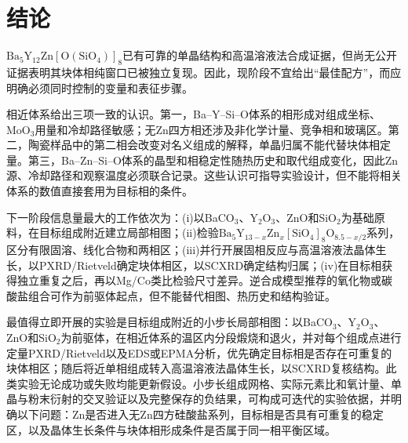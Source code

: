 \section{结论}
\label{sec:transferability}

$\mathrm{Ba_5Y_{12}Zn[O(SiO_4)]_8}$已有可靠的单晶结构和高温溶液法合成证据，但尚无公开证据表明其块体相纯窗口已被独立复现\cite{ababaikeri2024ba5y12zn}。因此，现阶段不宜给出“最佳配方”，而应明确必须同时控制的变量和表征步骤。

相近体系给出三项一致的认识。第一，Ba--Y--Si--O体系的相形成对组成坐标、MoO$_3$用量和冷却路径敏感；无Zn四方相还涉及非化学计量、竞争相和玻璃区\cite{wierzbickawieczorek2017high,yamane2024synthesis,gulay2024navigation}。第二，陶瓷样品中的第二相会改变对名义组成的解释，单晶归属不能代替块体相定量\cite{yamane2024microstructure}。第三，Ba--Zn--Si--O体系的晶型和相稳定性随热历史和取代组成变化，因此Zn源、冷却路径和观察温度必须联合记录\cite{lin1999phase,kerstan2013bazn2si2o7,zou2019anti}。这些认识可指导实验设计，但不能将相关体系的数值直接套用为目标相的条件。

下一阶段信息量最大的工作依次为：(i)以BaCO$_3$、Y$_2$O$_3$、ZnO和SiO$_2$为基础原料，在目标组成附近建立局部相图；(ii)检验$\mathrm{Ba_5Y_{13-\mathit{x}}Zn_{\mathit{x}}[SiO_4]_8O_{8.5-\mathit{x}/2}}$系列，区分有限固溶、线化合物和两相区；(iii)并行开展固相反应与高温溶液法晶体生长，以PXRD\slash Rietveld确定块体相区，以SCXRD确定结构归属；(iv)在目标相获得独立重复之后，再以Mg\slash Co类比检验尺寸差异。逆合成模型推荐的氧化物或碳酸盐组合可作为前驱体起点，但不能替代相图、热历史和结构验证。

最值得立即开展的实验是目标组成附近的小步长局部相图：以BaCO$_3$、Y$_2$O$_3$、ZnO和SiO$_2$为前驱体，在相近体系的温区内分段煅烧和退火，并对每个组成点进行定量PXRD\slash Rietveld以及EDS或EPMA分析，优先确定目标相是否存在可重复的块体相区；随后将近单相组成转入高温溶液法晶体生长，以SCXRD复核结构。此类实验无论成功或失败均能更新假设。小步长组成网格、实际元素比和氧计量、单晶与粉末衍射的交叉验证以及完整保存的负结果，可构成可迭代的实验依据，并明确以下问题：Zn是否进入无Zn四方硅酸盐系列，目标相是否具有可重复的稳定区，以及晶体生长条件与块体相形成条件是否属于同一相平衡区域。
